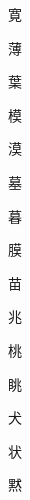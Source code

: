 \begin{spacing}{2.5}
{\Huge \begin{CJK}{UTF8}{min} 寛\end{CJK}}\hspace{0.1cm}
{\Huge \begin{CJK}{UTF8}{min} 薄\end{CJK}}\hspace{0.1cm}
{\Huge \begin{CJK}{UTF8}{min} 葉\end{CJK}}\hspace{0.1cm}
{\Huge \begin{CJK}{UTF8}{min} 模\end{CJK}}\hspace{0.1cm}
{\Huge \begin{CJK}{UTF8}{min} 漠\end{CJK}}\hspace{0.1cm}
{\Huge \begin{CJK}{UTF8}{min} 墓\end{CJK}}\hspace{0.1cm}
{\Huge \begin{CJK}{UTF8}{min} 暮\end{CJK}}\hspace{0.1cm}
{\Huge \begin{CJK}{UTF8}{min} 膜\end{CJK}}\hspace{0.1cm}
{\Huge \begin{CJK}{UTF8}{min} 苗\end{CJK}}\hspace{0.1cm}
{\Huge \begin{CJK}{UTF8}{min} 兆\end{CJK}}\hspace{0.1cm}
{\Huge \begin{CJK}{UTF8}{min} 桃\end{CJK}}\hspace{0.1cm}
{\Huge \begin{CJK}{UTF8}{min} 眺\end{CJK}}\hspace{0.1cm}
{\Huge \begin{CJK}{UTF8}{min} 犬\end{CJK}}\hspace{0.1cm}
{\Huge \begin{CJK}{UTF8}{min} 状\end{CJK}}\hspace{0.1cm}
{\Huge \begin{CJK}{UTF8}{min} 黙\end{CJK}}\hspace{0.1cm}

\end{spacing}
